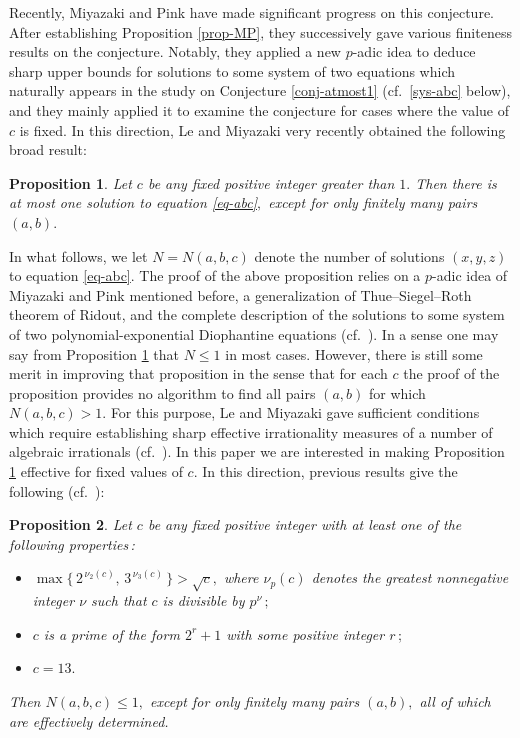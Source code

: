 \documentclass[11pt]{amsart}
\newtheorem{prop}{Proposition}[section]
\numberwithin{equation}{section}
\begin{document}
Recently, Miyazaki and Pink \cite{MP2, MP3} have made significant progress on this conjecture.
After establishing Proposition \ref{prop-MP}, they successively gave various finiteness results on the conjecture.
Notably, they applied a new $p$-adic idea to deduce sharp upper bounds for solutions to some system of two equations which naturally appears in the study on Conjecture \ref{conj-atmost1} (cf.~\eqref{sys-abc} below), and they mainly applied it to examine the conjecture for cases where the value of $c$ is fixed.
In this direction, Le and Miyazaki \cite{LM} very recently obtained the following broad result:

\begin{prop}\label{prop-LM}
Let $c$ be any fixed positive integer greater than $1.$
Then there is at most one solution to equation \eqref{eq-abc}$,$ except for only finitely many pairs $(a,b).$
\end{prop}

In what follows, we let $N = N(a,b,c)$ denote the number of solutions $(x,y,z)$ to equation \eqref{eq-abc}.
The proof of the above proposition relies on a $p$-adic idea of Miyazaki and Pink mentioned before, a generalization of Thue--Siegel--Roth theorem of Ridout, and the complete description of the solutions to some system of two polynomial-exponential Diophantine equations (cf.~\cite[Theorem 2]{LM}).
In a sense one may say from Proposition \ref{prop-LM} that $N \le 1$ in most cases.
However, there is still some merit in improving that proposition in the sense that for each $c$ the proof of the proposition provides no algorithm to find all pairs $(a,b)$ for which $N(a,b,c)>1$.
For this purpose, Le and Miyazaki gave sufficient conditions which require establishing sharp effective irrationality measures of a number of algebraic irrationals (cf.~\cite[Sec.\,6]{LM}). 
In this paper we are interested in making Proposition \ref{prop-LM} effective for fixed values of $c$.
In this direction, previous results give the following (cf.~\cite{MP2,MP3}):

\begin{prop}\label{prop-stateoftheart}
Let $c$ be any fixed positive integer with at least one of the following properties\,{\rm :}
\begin{itemize}
\item[$\bullet$] $\max\{\,2^{\,\nu_2(c)},\,3^{\,\nu_3(c)}\,\}>\sqrt{c},$ where $\nu_{p}(c)$ denotes the greatest nonnegative integer $\nu$ such that $c$ is divisible by $p^\nu\,;$
\item[$\bullet$] $c$ is a prime of the form $2^r+1$ with some positive integer $r$\,$;$
\item[$\bullet$] $c=13.$
\end{itemize}
Then $N(a,b,c) \le 1,$ except for only finitely many pairs $(a,b),$ all of which are effectively determined.
\end{prop}
\end{document}
